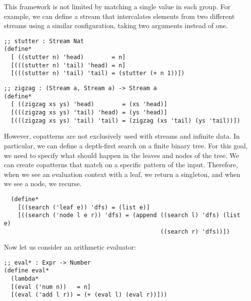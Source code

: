 This framework is not limited by matching a single value in each group.
For example, we can define a stream that intercalates elements from two different streams using a similar configuration, taking two arguments instead of one.

\begin{verbatim}
;; stutter : Stream Nat
(define*
  [ ((stutter n) 'head)        = n]
  [(((stutter n) 'tail) 'head) = n]
  [(((stutter n) 'tail) 'tail) = (stutter (+ n 1))])
\end{verbatim}

\begin{verbatim}
;; zigzag : (Stream a, Stream a) -> Stream a
(define*
  [ ((zigzag xs ys) 'head)        = (xs 'head)]
  [(((zigzag xs ys) 'tail) 'head) = (ys 'head)]
  [(((zigzag xs ys) 'tail) 'tail) = (zigzag (xs 'tail) (ys 'tail))])
\end{verbatim}

However, copatterns are not exclusively used with streams and infinite data.
In particular, we can define a depth-first search on a finite binary tree.
For this goal, we need to specify what should happen in the leaves and nodes of the tree.
We can create copatterns that match on a specific pattern of the input.
Therefore, when we see an evaluation context with a leaf, we return a singleton, and when we see a node, we recurse.

\begin{verbatim}
  (define*
    [((search ('leaf e)) 'dfs) = (list e)]
    [((search ('node l e r)) 'dfs) = (append ((search l) 'dfs) (list e)
                                             ((search r) 'dfs))])
  \end{verbatim}

Now let us consider an arithmetic evaluator:

\begin{verbatim}
;; eval* : Expr -> Number
(define eval*
  (lambda*
  [(eval ('num n))   = n]
  [(eval ('add l r)) = (+ (eval l) (eval r))]))
\end{verbatim}

